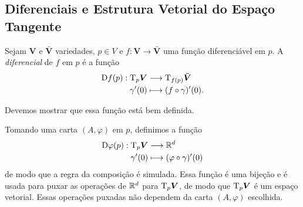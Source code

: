 \subsection{Diferenciais e Estrutura Vetorial do Espaço Tangente}

\begin{defi}
Sejam $\bm V$ e $\bm{\bar V}$ variedades, $p \in V$ e $f: \bm V \to \bm{\bar V}$ uma função diferenciável em $p$. A \emph{diferencial} de $f$ em $p$ é a função
	\begin{align*}
	{\mathrm{D}f(p)}: {\mathrm{T}_p\bm V} &\longrightarrow {\mathrm{T}_{f(p)}\bm{\bar V}} \\{\gamma'(0)} &\longmapsto {(f \circ \gamma)'(0)}.
	\end{align*}
\end{defi}

Devemos mostrar que essa função está bem definida.

Tomando uma carta $(A,\varphi)$ em $p$, definimos a função
	\begin{align*}
	{\mathrm{D}\varphi(p)}: {\mathrm{T}_p \bm V} &\longrightarrow {\mathbb{R}^d} \\{\gamma'(0)} &\longmapsto {(\varphi \circ \gamma)'(0)}
	\end{align*}
de modo que a regra da composição é simulada. Essa função é uma bijeção e é usada para puxar as operações de $\mathbb{R}^d$ para $\mathrm{T}_p \bm V$, de modo que $\mathrm{T}_p \bm V$ é um espaço vetorial. Essas operações puxadas não dependem da carta $(A,\varphi)$ escolhida.






























\cleardoublepage





